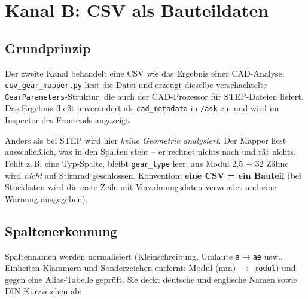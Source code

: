 \documentclass[12pt, a4paper]{article}
\begin{document}
\section{Kanal B: CSV als Bauteildaten}

\subsection{Grundprinzip}

Der zweite Kanal behandelt eine CSV wie das Ergebnis einer CAD-Analyse:
\texttt{csv\_gear\_mapper.py} liest die Datei und erzeugt dieselbe
verschachtelte \texttt{GearParameters}-Struktur, die auch der CAD-Prozessor
für STEP-Dateien liefert. Das Ergebnis fließt unverändert als
\texttt{cad\_metadata} in \texttt{/ask} ein und wird im Inspector des Frontends
angezeigt.

\begin{hinweisbox}
Anders als bei STEP wird hier \emph{keine Geometrie analysiert}. Der Mapper
liest ausschließlich, was in den Spalten steht -- er rechnet nichts nach und
rät nichts. Fehlt z.\,B. eine Typ-Spalte, bleibt \texttt{gear\_type} leer;
aus \glqq Modul 2{,}5 + 32 Zähne\grqq{} wird \emph{nicht} auf
\glqq Stirnrad\grqq{} geschlossen. Konvention: \textbf{eine CSV = ein Bauteil}
(bei Stücklisten wird die erste Zeile mit Verzahnungsdaten verwendet und eine
Warnung ausgegeben).
\end{hinweisbox}

\subsection{Spaltenerkennung}

Spaltennamen werden normalisiert (Kleinschreibung, Umlaute
\texttt{ä$\rightarrow$ae} usw., Einheiten-Klammern und Sonderzeichen entfernt:
\glqq Modul (mm)\grqq{} $\rightarrow$ \texttt{modul}) und gegen eine
Alias-Tabelle geprüft. Sie deckt deutsche und englische Namen sowie
DIN-Kurzzeichen ab:
\end{document}
